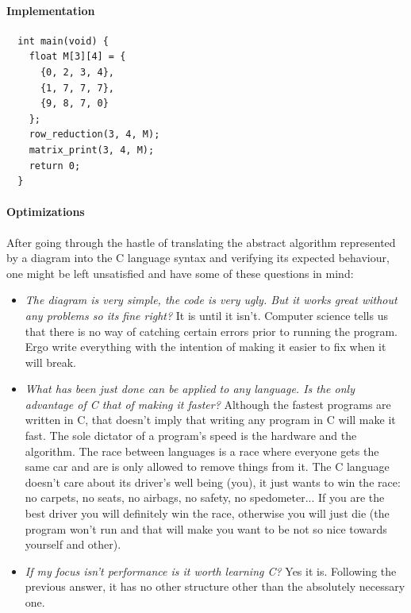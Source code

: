 \documentclass{article}
\begin{document}
\paragraph{Implementation}
\begin{verbatim}
  int main(void) {
    float M[3][4] = {
      {0, 2, 3, 4},
      {1, 7, 7, 7},
      {9, 8, 7, 0}
    };
    row_reduction(3, 4, M);
    matrix_print(3, 4, M);
    return 0;
  }
\end{verbatim}



\pagebreak

\paragraph{Optimizations}
After going through the hastle of translating the abstract algorithm
represented by a diagram into the C language syntax and verifying
its expected behaviour, one might be left unsatisfied and have some
of these questions in mind:
\begin{itemize}
\item
  \textit{The diagram is very simple, the code is very ugly. But it works
  great without any problems so its fine right?} It is until it isn't.
  Computer science tells us that there is no way of catching certain
  errors prior to running the program. Ergo write everything with the
  intention of making it easier to fix when it will break.
\item
  \textit{What has been just done can be applied to any language. Is the only
  advantage of C that of making it faster?}
  Although the fastest programs are written in C, that doesn't imply that
  writing any program in C will make it fast.
  The sole dictator of a program's speed is the hardware and the algorithm.
  The race between languages is a race where everyone gets the same car and
  are is only allowed to remove things from it. The C language doesn't care
  about its driver's well being (you), it just wants to win the race:
  no carpets, no seats, no airbags, no safety, no spedometer...
  If you are the best driver you will definitely win the race, otherwise
  you will just die (the program won't run and that will make you want
  to be not so nice towards yourself and other).
\item
  \textit{If my focus isn't performance is it worth learning C?}
  Yes it is. Following the previous answer, it has no other structure other
  than the absolutely necessary one.
\end{itemize}
\end{document}
